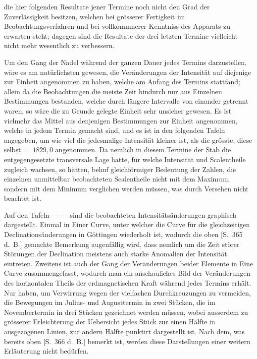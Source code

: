 \documentclass[12pt,a4paper]{article}
\begin{document}
\newpage
\noindent
die hier folgenden Resultate jener Termine noch nicht den Grad der Zuverl\"assigkeit besitzen, welchen bei gr\"osserer Fertigkeit im Beobachtungsverfahren und bei vollkommnerer Kenntniss des Apparats zu erwarten steht; dagegen sind die Resultate der drei letzten Termine vielleicht nicht mehr wesentlich zu verbessern.

Um den Gang der Nadel w\"ahrend der ganzen Dauer jedes Termins darzustellen, w\"are es am nat\"urlichsten gewesen, die Ver\"anderungen der Intensit\"at auf diejenige zur Einheit angenommen zu haben, welche am Anfang des Termins stattfand; allein da die Beobachtungen die meiste Zeit hindurch nur aus Einzelnen Bestimmungen bestanden, welche durch l\"angere Intervalle von einander getrennt waren, so w\"are die zu Grunde gelegte Einheit sehr unsicher gewesen. Es ist vielmehr das Mittel aus denjenigen Bestimmungen zur Einheit angenommen, welche in jedem Termin gemacht sind, und es ist in den folgenden Tafeln angegeben, um wie viel die jedesmalige Intensit\"at kleiner ist, als die gr\"osste, diese selbst $=1829{,}0$ angenommen. Da nemlich in diesem Termine der Stab die entgegengesetzte transversale Lage hatte, f\"ur welche Intensit\"at und Scalentheile zugleich wachsen, so h\"atten, behuf gleichf\"ormiger Bedeutung der Zahlen, die einzelnen unmittelbar beobachteten Scalentheile nicht mit dem Maximum, sondern mit dem Minimum verglichen werden m\"ussen, was durch Versehen nicht beachtet ist.

Auf den Tafeln --- --- sind die beobachteten Intensit\"ats\"anderungen graphisch dargestellt. Einmal in Einer Curve, unter welcher die Curve f\"ur die gleichzeitigen Declinations\"anderungen in G\"ottingen wiederholt ist, wodurch die oben [S.~365 d.~B.] gemachte Bemerkung augenf\"allig wird, dass nemlich um die Zeit st\"orer St\"orungen der Declination meistens auch starke Anomalien der Intensit\"at eintreten. Zweitens ist auch der Gang der Ver\"anderungen beider Elemente in Eine Curve zusammengefasst, wodurch man ein anschauliches Bild der Ver\"anderungen des horizontalen Theils der erdmagnetischen Kraft w\"ahrend jedes Termins erh\"alt. Nur haben, um Verwirrung wegen der vielfachen Durchkreuzungen zu vermeiden, die Bewegungen im Julius- und Augusttermin in zwei St\"ucken, die im Novembertermin in drei St\"ucken gezeichnet werden m\"ussen, wobei ausserdem zu gr\"osserer Erleichterung der Uebersicht jedes St\"uck zur einen H\"alfte in ausgezogenen Linien, zur andern H\"alfte punktirt dargestellt ist. Nach dem, was bereits oben [S.~366 d.~B.] bemerkt ist, werden diese Darstellungen einer weitern Erl\"auterung nicht bed\"urfen.
\end{document}
